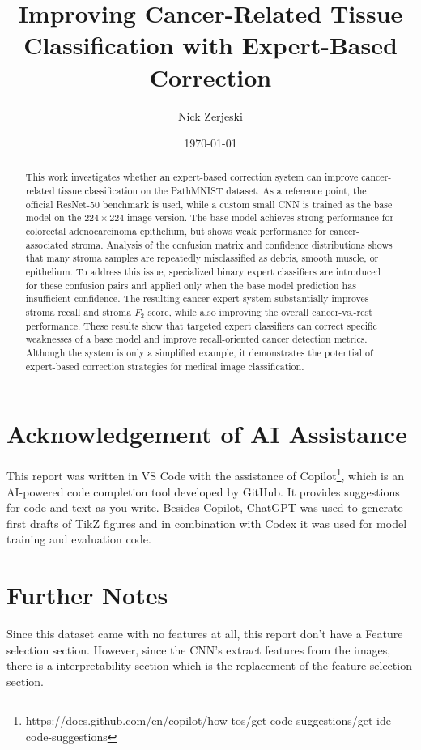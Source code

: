 \documentclass[11pt,a4paper]{article}
\title{Improving Cancer-Related Tissue Classification with Expert-Based Correction}
\author{Nick Zerjeski}
\date{\today}
\begin{document}
\maketitle

\begin{abstract}
This work investigates whether an expert-based correction system can improve
cancer-related tissue classification on the PathMNIST dataset. As a reference
point, the official ResNet-50 benchmark is used, while a custom small CNN is
trained as the base model on the $224 \times 224$ image version. The base model
achieves strong performance for colorectal adenocarcinoma epithelium, but shows
weak performance for cancer-associated stroma. Analysis of the confusion matrix
and confidence distributions shows that many stroma samples are repeatedly
misclassified as debris, smooth muscle, or epithelium. To address this issue,
specialized binary expert classifiers are introduced for these confusion pairs
and applied only when the base model prediction has insufficient confidence. The
resulting cancer expert system substantially improves stroma recall and stroma
$F_2$ score, while also improving the overall cancer-vs.-rest performance. These
results show that targeted expert classifiers can correct specific weaknesses of
a base model and improve recall-oriented cancer detection metrics. Although the
system is only a simplified example, it demonstrates the potential of
expert-based correction strategies for medical image classification.
\end{abstract}
\newpage
\tableofcontents
\newpage

\setcounter{page}{1}








\appendix
\section*{Acknowledgement of AI Assistance}
This report was written in VS Code with the assistance of Copilot\footnote{https://docs.github.com/en/copilot/how-tos/get-code-suggestions/get-ide-code-suggestions},
which is an AI-powered code completion tool developed by GitHub. It provides
suggestions for code and text as you write. Besides Copilot, ChatGPT was used to
generate first drafts of TikZ figures and in combination with Codex it was used
for model training and evaluation code.
\section*{Further Notes}
Since this dataset came with no features at all, this report don't have a
Feature selection section. However, since the CNN's extract features from the
images, there is a interpretability section which is the replacement of the 
feature selection section.
\end{document}
